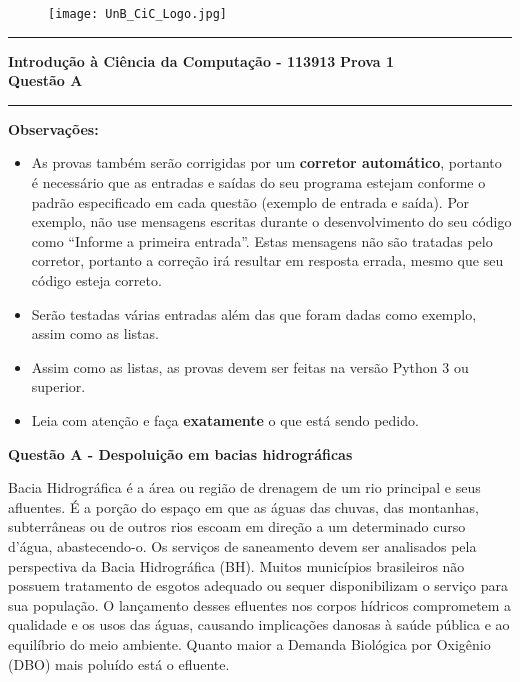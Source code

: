 \documentclass[a4paper, 12pt]{article}
\begin{document}
\begin{figure}[H]
	\texttt{[image: UnB\_CiC\_Logo.jpg]}
\end{figure}
\noindent\rule{\textwidth}{0.4pt}
\begin{center}
	\textbf{{\Large Introdução à Ciência da Computação - 113913}} \newline \newline
	\textbf{{\large Prova 1} \\
	\vspace{9pt}
	{\large Questão A}} \\
	\noindent\rule{\textwidth}{0.4pt}
	\newline
\end{center}

\textbf{{\large Observações:}}
\begin{itemize}
	\item As provas também serão corrigidas por um \textbf{corretor automático}, portanto é necessário que as entradas e saídas do seu programa estejam conforme o padrão especificado em cada questão (exemplo de entrada e saída). Por exemplo, não use mensagens escritas durante o desenvolvimento do seu código como “Informe a primeira entrada”. Estas mensagens não são tratadas pelo corretor, portanto a correção irá resultar em resposta errada, mesmo que seu código esteja correto.
	\item Serão testadas várias entradas além das que foram dadas como exemplo, assim como as listas.
	\item Assim como as listas, as provas devem ser feitas na versão Python 3 ou superior.
	\item Leia com atenção e faça \textbf{exatamente} o que está sendo pedido.
\end{itemize}
\newpage %
\begin{center}
\textbf{{\Large Questão A - Despoluição em bacias hidrográficas}}
\end{center}
\vspace{5pt}
Bacia Hidrográfica é a área ou região de drenagem de um rio principal e seus afluentes. É a porção do espaço em que as águas das chuvas, das montanhas, subterrâneas ou de outros rios escoam em direção a um determinado curso d’água, abastecendo-o. Os serviços de saneamento devem ser analisados pela perspectiva da Bacia Hidrográfica (BH).  Muitos municípios brasileiros não possuem tratamento de esgotos adequado ou sequer disponibilizam o serviço para sua população. O lançamento desses efluentes nos corpos hídricos comprometem a qualidade e os usos das águas, causando implicações danosas à saúde pública e ao equilíbrio do meio ambiente. Quanto maior a Demanda Biológica por Oxigênio (DBO) mais poluído está o efluente. 
\end{document}
